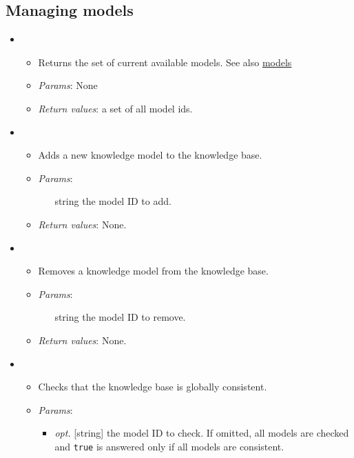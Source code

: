 \subsection{Managing models}


\begin{itemize}
\item  {}
\begin{itemize}
\item  Returns the set of current available models. See also \hyperref[ac5552fd6a3c08ad22387efbe42d137d]{models}
\item  \emph{Params}: None
\item  \emph{Return values}: a set of all model ids.
\end{itemize}

\item  {}
\begin{itemize}
\item  Adds a new knowledge model to the knowledge base.
\item  \emph{Params}:
\begin{itemize}
\item  [string] the model ID to add.
\end{itemize}

\item  \emph{Return values}: None.
\end{itemize}

\item  {}
\begin{itemize}
\item  Removes a knowledge model from the knowledge base.
\item  \emph{Params}:
\begin{itemize}
\item  [string] the model ID to remove.
\end{itemize}

\item  \emph{Return values}: None.
\end{itemize}

\item  {}
\begin{itemize}
\item  Checks that the knowledge base is globally consistent.
\item  \emph{Params}:
\begin{itemize}
\item  \emph{opt.} [string] the model ID to check. If omitted, all models are checked and \texttt{true} is answered only if all models are consistent. 
\end{itemize}


\end{itemize}
\end{itemize}
